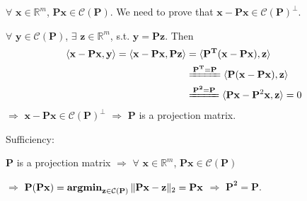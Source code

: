 \documentclass[11pt,letter,notitlepage]{article}
\DeclareMathOperator*{\argmin}{\bf argmin}
\begin{document}
\begin{solution}
\begin{enumerate}
\begin{enumerate}
		$\forall$ $\mathbf{x} \in \mathbb{R}^m$, $\mathbf{Px} \in \mathcal{C}(\mathbf{P})$. We need to prove that $\mathbf{x} - \mathbf{Px} \in \mathcal{C}(\mathbf{P})^{\perp}$.

		$\forall$ $\mathbf{y} \in \mathcal{C}(\mathbf{P})$, $\exists$ $\mathbf{z} \in \mathbb{R}^m$, s.t. $\mathbf{y} = \mathbf{Pz}$. Then
		\begin{align*}
		\langle \mathbf{x} - \mathbf{Px}, \mathbf{y} \rangle
		=
		\langle \mathbf{x} - \mathbf{Px}, \mathbf{Pz} \rangle
		&=
		\langle \mathbf{P^T}(\mathbf{x} - \mathbf{Px}), \mathbf{z} \rangle\\
		&\xlongequal{\mathbf{P^T} = \mathbf{P}}
		\langle \mathbf{P}(\mathbf{x} - \mathbf{Px}), \mathbf{z} \rangle\\
		&\xlongequal{\mathbf{P^2} = \mathbf{P}}
		\langle \mathbf{Px} - \mathbf{P}^2\mathbf{x}, \mathbf{z} \rangle
		=
		0
		\end{align*}
		$\Longrightarrow$ $\mathbf{x} - \mathbf{Px} \in \mathcal{C}(\mathbf{P})^{\perp}$ $\Longrightarrow$ $\mathbf{P}$ is a projection matrix.

		 Sufficiency:

		$\mathbf{P}$ is a projection matrix $\Longrightarrow$ $\forall$ $\mathbf{x} \in \mathbb{R}^m$, $\mathbf{Px} \in \mathcal{C}(\mathbf{P})$
		
		$\Longrightarrow$ $\mathbf{P}(\mathbf{Px}) = \argmin_{\mathbf{z} \in \mathcal{C}(\mathbf{P})} \Vert \mathbf{Px} - \mathbf{z} \Vert_2 = \mathbf{Px}$ $\Longrightarrow$ $\mathbf{P^2} = \mathbf{P}$.


\end{enumerate}
\end{enumerate}
\end{solution}
\end{document}
